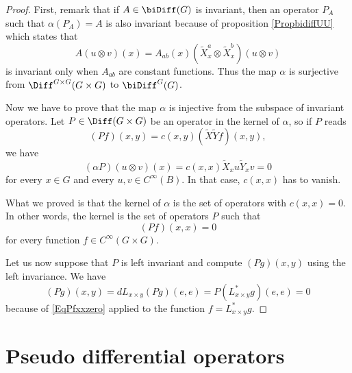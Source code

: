 \begin{proof}
	First, remark that if $A\in\biDiff(G)$ is invariant, then an operator $P_A$ such that $\alpha(P_A)=A$ is also invariant because of proposition \ref{PropbidiffUU} which states that
	\begin{equation}
		A(u\otimes v)(x)=A_{ab}(x)(\tilde X^a_x\otimes \tilde X^b_x)(u\otimes v)
	\end{equation}
	is invariant only when $A_{ab}$ are constant functions. Thus the map $\alpha$ is surjective from $\Diff^{G\times G}(G\times G)$ to $\biDiff^G(G)$.

	Now we have to prove that the map $\alpha$ is injective from the subspace of invariant operators. Let $P\in\Diff(G\times G)$ be an operator in the kernel of $\alpha$, so if $P$ reads
	\begin{equation}
		(Pf)(x,y)=c(x,y)(\tilde X\tilde Yf)(x,y),
	\end{equation}
	we have
	\begin{equation}
		(\alpha P)(u\otimes v)(x)=c(x,x)\tilde X_xu\tilde Y_xv=0
	\end{equation}
	for every $x\in G$ and every $u,v\in C^{\infty}(B)$. In that case, $c(x,x)$ has to vanish.

	What we proved is that the kernel of $\alpha$ is the set of operators with $c(x,x)=0$. In other words, the kernel is the set of operators $P$ such that
	\begin{equation}	\label{EqPfxxzero}
		(Pf)(x,x)=0
	\end{equation}
	for every function $f\in C^{\infty}(G\times G)$.

	Let us now suppose that $P$ is left invariant and compute $(Pg)(x,y)$ using the left invariance. We have
	\begin{equation}
		(Pg)(x,y)=dL_{x\times y}(Pg)(e,e)=P(L^*_{x\times y}g)(e,e)=0
	\end{equation}
	because of \eqref{EqPfxxzero} applied to the function $f=L^*_{x\times y}g$.
\end{proof}


\section{Pseudo differential operators}

